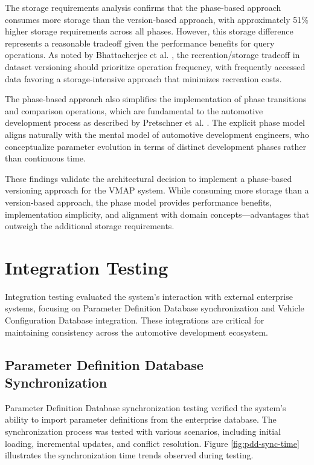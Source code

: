 The storage requirements analysis confirms that the phase-based approach consumes more storage than the version-based approach, with approximately 51\% higher storage requirements across all phases. However, this storage difference represents a reasonable tradeoff given the performance benefits for query operations. As noted by Bhattacherjee et al. \cite{bhattacherjee2015principles}, the recreation/storage tradeoff in dataset versioning should prioritize operation frequency, with frequently accessed data favoring a storage-intensive approach that minimizes recreation costs.

The phase-based approach also simplifies the implementation of phase transitions and comparison operations, which are fundamental to the automotive development process as described by Pretschner et al. \cite{pretschner2007software}. The explicit phase model aligns naturally with the mental model of automotive development engineers, who conceptualize parameter evolution in terms of distinct development phases rather than continuous time.

These findings validate the architectural decision to implement a phase-based versioning approach for the VMAP system. While consuming more storage than a version-based approach, the phase model provides performance benefits, implementation simplicity, and alignment with domain concepts—advantages that outweigh the additional storage requirements.

\section{Integration Testing}
\label{sec:integration-testing}

Integration testing evaluated the system's interaction with external enterprise systems, focusing on Parameter Definition Database synchronization and Vehicle Configuration Database integration. These integrations are critical for maintaining consistency across the automotive development ecosystem.

\subsection{Parameter Definition Database Synchronization}
\label{subsec:pdd-synchronization-testing}

Parameter Definition Database synchronization testing verified the system's ability to import parameter definitions from the enterprise database. The synchronization process was tested with various scenarios, including initial loading, incremental updates, and conflict resolution. Figure \ref{fig:pdd-sync-time} illustrates the synchronization time trends observed during testing.

